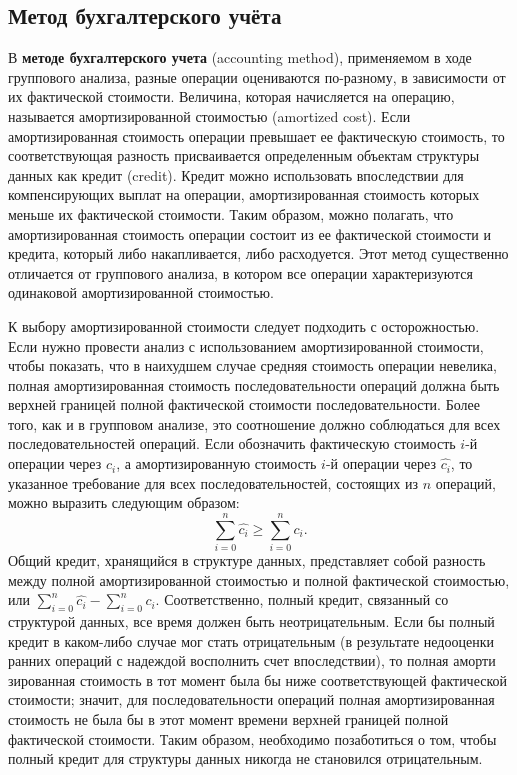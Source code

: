\subsection{Метод бухгалтерского учёта}

В \textbf{методе бухгалтерского учета} (accounting method), применяемом в ходе группового анализа, разные операции оцениваются по-разному, в зависимости от их фактической стоимости.
Величина, которая начисляется на операцию, называется амортизированной стоимостью (amortized cost).
Если амортизированная стоимость операции превышает ее фактическую стоимость, то соответствующая разность присваивается определенным объектам структуры данных как кредит (credit).
Кредит можно использовать впоследствии для компенсирующих выплат на операции, амортизированная стоимость которых меньше их фактической стоимости.
Таким образом, можно полагать, что амортизированная стоимость операции состоит из ее фактической стоимости и кредита, который либо накапливается, либо расходуется.
Этот метод существенно отличается от группового анализа, в котором все операции характеризуются одинаковой амортизированной стоимостью.

К выбору амортизированной стоимости следует подходить с осторожностью.
Если нужно провести анализ с использованием амортизированной стоимости, чтобы показать, что в наихудшем случае средняя стоимость операции невелика, полная амортизированная стоимость последовательности операций должна быть верхней границей полной фактической стоимости последовательности.
Более того, как и в групповом анализе, это соотношение должно соблюдаться для всех последовательностей операций.
Если обозначить фактическую стоимость $i$-й операции через $c_i$, а амортизированную стоимость $i$-й операции через $\hat{c_i}$, то указанное требование для всех последовательностей, состоящих из $n$ операций, можно выразить следующим образом: $$\sum_{i = 0}^n \hat{c_i} \ge \sum_{i = 0}^n c_i.$$
Общий кредит, хранящийся в структуре данных, представляет собой разность между полной амортизированной стоимостью и полной фактической стоимостью, или $\sum_{i = 0}^n \hat{c_i} - \sum_{i = 0}^n c_i$.
Соответственно, полный кредит, связанный со
структурой данных, все время должен быть неотрицательным.
Если бы полный кредит в каком-либо случае мог стать отрицательным (в результате недооценки ранних операций с надеждой восполнить счет впоследствии), то полная аморти зированная стоимость в тот момент была бы ниже соответствующей фактической стоимости; значит, для последовательности операций полная амортизированная стоимость не была бы в этот момент времени верхней границей полной фактической стоимости.
Таким образом, необходимо позаботиться о том, чтобы полный кредит для структуры данных никогда не становился отрицательным.

